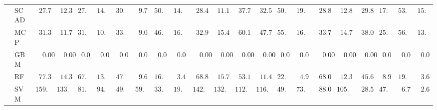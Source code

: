 \begin{tabular}{llllllllllllllllllllll}
	& SCAD  & $\phantom{0}27.77$ & $\phantom{0}12.34$ & $27.82$ & $14.35$ & $30.26$ & $\phantom{0}9.76$ & $50.65$ & $14.71$ & $\phantom{0}28.49$ & $\phantom{0}11.19$ & $\phantom{0}37.71$ & $\phantom{0}32.58$ & $50.22$ & $19.72$ & $\phantom{0}28.88$ & $\phantom{0}12.84$ & $\phantom{0}29.80$ & $17.22$ & $53.75$ & $15.75$ \\
	& MCP  & $\phantom{0}31.37$ & $\phantom{0}11.71$ & $31.72$ & $10.98$ & $33.72$ & $\phantom{0}9.00$ & $46.51$ & $16.00$ & $\phantom{0}32.96$ & $\phantom{0}15.41$ & $\phantom{0}60.14$ & $\phantom{0}47.76$ & $55.20$ & $16.70$ & $\phantom{0}33.78$ & $\phantom{0}14.76$ & $\phantom{0}38.07$ & $25.28$ & $56.70$ & $13.61$ \\
	& GBM  & $\phantom{00}0.00$ & $\phantom{00}0.00$ & $\phantom{0}0.00$ & $\phantom{0}0.00$ & $\phantom{0}0.00$ & $\phantom{0}0.00$ & $\phantom{0}0.00$ & $\phantom{0}0.00$ & $\phantom{00}0.00$ & $\phantom{00}0.00$ & $\phantom{00}0.00$ & $\phantom{00}0.00$ & $\phantom{0}0.00$ & $\phantom{0}0.00$ & $\phantom{00}0.00$ & $\phantom{00}0.00$ & $\phantom{00}0.00$ & $\phantom{0}0.00$ & $\phantom{0}0.00$ & $\phantom{0}0.00$ \\
	& RF  & $\phantom{0}77.31$ & $\phantom{0}14.37$ & $67.78$ & $13.35$ & $47.85$ & $\phantom{0}9.60$ & $16.38$ & $\phantom{0}3.44$ & $\phantom{0}68.81$ & $\phantom{0}15.73$ & $\phantom{0}53.11$ & $\phantom{0}11.43$ & $22.23$ & $\phantom{0}4.96$ & $\phantom{0}68.02$ & $\phantom{0}12.31$ & $\phantom{0}45.69$ & $\phantom{0}8.92$ & $19.15$ & $\phantom{0}3.69$ \\
	& SVM  & $159.93$ & $133.99$ & $81.76$ & $94.03$ & $49.00$ & $59.08$ & $33.34$ & $19.99$ & $142.86$ & $132.04$ & $112.23$ & $116.37$ & $49.15$ & $73.90$ & $\phantom{0}88.08$ & $105.63$ & $\phantom{0}28.52$ & $47.94$ & $\phantom{0}6.74$ & $\phantom{0}2.65$ \\
	\hline 
\end{tabular}